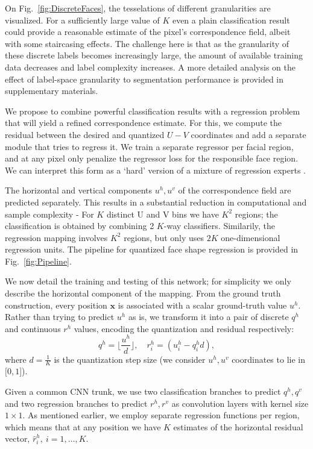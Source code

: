 On Fig.~\ref{fig:DiscreteFaces}, the tesselations of different granularities are visualized. For a sufficiently large value of $K$ even a plain classification result could provide a reasonable estimate of the pixel's correspondence field, albeit with some staircasing effects. The challenge here is that as the granularity of these discrete labels becomes increasingly large, the amount of available training data decreases and label complexity increases. A more detailed analysis on the effect of label-space granularity to segmentation performance is provided in supplementary materials.

We propose to combine powerful classification results with a regression problem that will yield a  refined  correspondence estimate. For this, we compute the residual between the desired and quantized $U-V$  coordinates and add a separate module that tries to regress it. We train a separate regressor per facial region, and at any pixel only penalize the regressor loss for the responsible face region. We can interpret this form as a `hard' version of a mixture of regression experts \cite{JordanJ94}. 

The horizontal and vertical components $u^h,u^v$ of the correspondence field are predicted separately. This results in a substantial reduction in computational and sample complexity -  For $K$ distinct U and V bins we have $K^2$ regions; the classification is obtained by combining 2 $K$-way classifiers. Similarily, the regression mapping involves $K^2$ regions, but only uses $2 K$ one-dimensional regression units. The pipeline for quantized face shape regression is provided in Fig.~\ref{fig:Pipeline}.

We now detail the training and testing of this network;  for simplicity we only describe the horizontal component of the mapping. 
From the ground truth construction, every position $\bm{x}$ is associated with a scalar ground-truth value $u^h$. Rather than trying to predict $u^h$ as is, we transform it into a pair of discrete $q^h$ and continuous $r^h$ values, encoding the quantization and residual respectively:
\begin{equation} 
q^h =  \lfloor {\frac{u^h}{d}} \rfloor, \quad  r_i^h =   \left(u^h_i - q^h_i d  \right),
\end{equation}
where $d = \frac{1}{K}$ is the quantization step size (we consider $u^h,u^v$ coordinates to lie in $[0,1$]).

Given a common CNN trunk, we use two classification branches to predict $q^h, q^v$ and two regression branches to predict $r^h,r^v$ as convolution layers with kernel size $1\times1$. As mentioned earlier, we employ separate regression functions per region, which means that at any position we have $K$ estimates of the horizontal residual vector, $\hat{r}^h_{i},~i=1,\ldots,K$.

